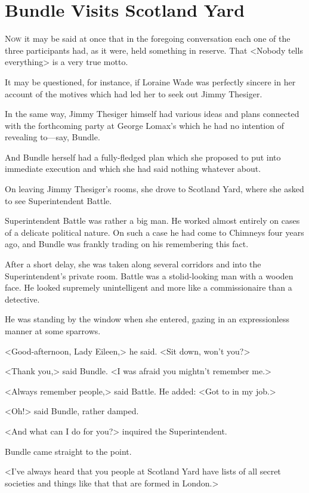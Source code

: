 \chapter{Bundle Visits Scotland Yard}

\lettrine{N}{ow} it may be said at once that in the foregoing conversation each one of the three participants had, as it were, held something in reserve. That <Nobody tells everything> is a very true motto.

\zz
It may be questioned, for instance, if Loraine Wade was perfectly sincere in her account of the motives which had led her to seek out Jimmy Thesiger.

In the same way, Jimmy Thesiger himself had various ideas and plans connected with the forthcoming party at George Lomax's which he had no intention of revealing to—say, Bundle.

And Bundle herself had a fully-fledged plan which she proposed to put into immediate execution and which she had said nothing whatever about.

On leaving Jimmy Thesiger's rooms, she drove to Scotland Yard, where she asked to see Superintendent Battle.

Superintendent Battle was rather a big man. He worked almost entirely on cases of a delicate political nature. On such a case he had come to Chimneys four years ago, and Bundle was frankly trading on his remembering this fact.

After a short delay, she was taken along several corridors and into the Superintendent's private room. Battle was a stolid-looking man with a wooden face. He looked supremely unintelligent and more like a commissionaire than a detective.

He was standing by the window when she entered, gazing in an expressionless manner at some sparrows.

<Good-afternoon, Lady Eileen,> he said. <Sit down, won't you?>

<Thank you,> said Bundle. <I was afraid you mightn't remember me.>

<Always remember people,> said Battle. He added: <Got to in my job.>

<Oh!> said Bundle, rather damped.

<And what can I do for you?> inquired the Superintendent.

Bundle came straight to the point.

<I've always heard that you people at Scotland Yard have lists of all secret societies and things like that that are formed in London.>

